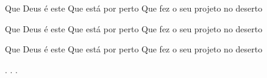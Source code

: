 Que Deus é este
Que está por perto
Que fez o seu projeto no deserto

Que Deus é este
Que está por perto
Que fez o seu projeto no deserto

Que Deus é este
Que está por perto
Que fez o seu projeto no deserto


\beginverse*
.
.
.
\endverse
\begin{comment}
\lstset{basicstyle=\scriptsize\bf} %
\tab{Solo 1}
\begin{lstlisting}
E|-----------------------------------------------------|
B|-----------------------------------------------------|
G|-----------------------------------------------------|
D|-----------------------------------------------------|
A|-----------------------------------------------------|
E|-----------------------------------------------------|
\end{lstlisting}
\end{comment}
\vspace{2em} 
% 
% 
% 
% 
\endsong
\begin{comment}

\end{comment}